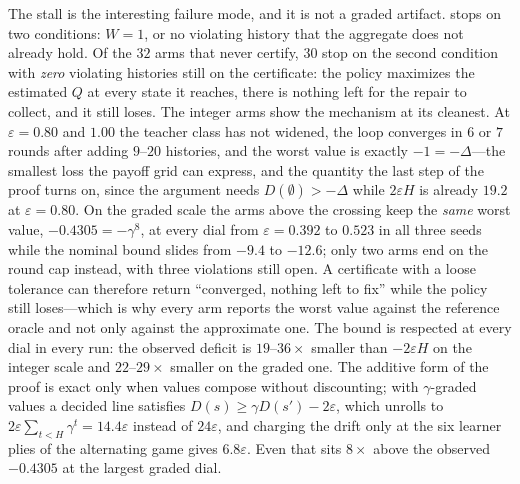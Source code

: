 \documentclass[conference]{IEEEtran}
\begin{document}
The stall is the interesting failure mode, and it is not a graded artifact.  stops on two conditions: $W=1$, or no violating history that the aggregate does not already hold. Of the $32$ arms that never certify, $30$ stop on the second condition with \emph{zero} violating histories still on the certificate: the policy maximizes the estimated $Q$ at every state it reaches, there is nothing left for the repair to collect, and it still loses. The integer arms show the mechanism at its cleanest. At $\varepsilon=0.80$ and $1.00$ the teacher class has not widened, the loop converges in $6$ or $7$ rounds after adding $9$--$20$ histories, and the worst value is exactly $-1=-\Delta$---the smallest loss the payoff grid can express, and the quantity the last step of the proof turns on, since the argument needs $D(\emptyset)>-\Delta$ while $2\varepsilon H$ is already $19.2$ at $\varepsilon=0.80$. On the graded scale the arms above the crossing keep the \emph{same} worst value, $-0.4305=-\gamma^{8}$, at every dial from $\varepsilon=0.392$ to $0.523$ in all three seeds while the nominal bound slides from $-9.4$ to $-12.6$; only two arms end on the round cap instead, with three violations still open. A certificate with a loose tolerance can therefore return ``converged, nothing left to fix'' while the policy still loses---which is why every arm reports the worst value against the reference oracle and not only against the approximate one. The bound is respected at every dial in every run: the observed deficit is $19$--$36\times$ smaller than $-2\varepsilon H$ on the integer scale and $22$--$29\times$ smaller on the graded one. The additive form of the proof is exact only when values compose without discounting; with $\gamma$-graded values a decided line satisfies $D(s)\ge\gamma D(s')-2\varepsilon$, which unrolls to $2\varepsilon\sum_{t<H}\gamma^{t}=14.4\varepsilon$ instead of $24\varepsilon$, and charging the drift only at the six learner plies of the alternating game gives $6.8\varepsilon$. Even that sits $8\times$ above the observed $-0.4305$ at the largest graded dial.
\end{document}
